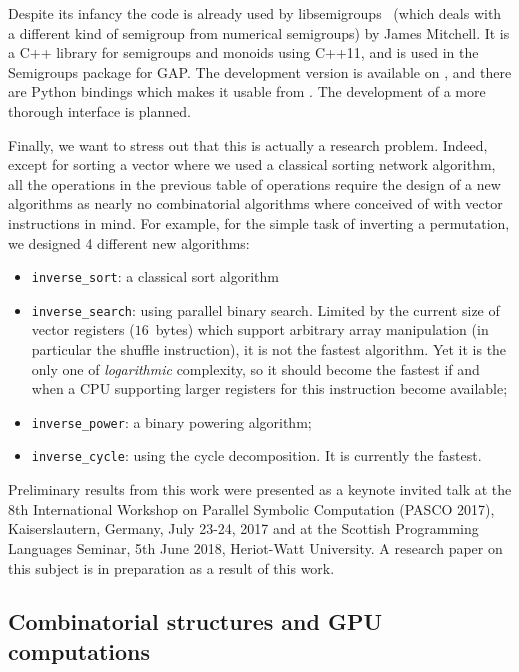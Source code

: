 \documentclass{deliverablereport}
\begin{document}
Despite its infancy the code is already used by
libsemigroups~\cite{libsemigroups} (which deals with a different kind of
semigroup from numerical semigroups) by James Mitchell. It is a C++ library
for semigroups and monoids using C++11, and is used in the Semigroups package
for GAP. The development version is available on \GitHub, and there are Python
bindings which makes it usable from \Sage. The development of a more thorough
\Sage interface is planned.  \bigskip

Finally, we want to stress out that this is actually a research
problem. Indeed, except for sorting a vector where we used a classical sorting
network algorithm, all the operations in the previous table of operations
require the design of a new algorithms as nearly no combinatorial algorithms
where conceived of with vector instructions in mind. For example, for the
simple task of inverting a permutation, we designed 4 different new
algorithms:
\begin{itemize}
\item \verb|inverse_sort|:  a classical sort algorithm
\item \verb|inverse_search|:  using parallel binary
  search. Limited by the current size of vector registers ($16$~bytes) which support
  arbitrary array manipulation (in particular the shuffle instruction), it is
  not the fastest algorithm. Yet it is the only one of {\em logarithmic} complexity,
  so it should become the fastest if and when a CPU supporting larger registers
  for this instruction become available;
\item \verb|inverse_power|: a binary powering algorithm;
\item \verb|inverse_cycle|: using the cycle decomposition. It is currently the fastest.
\end{itemize}
Preliminary results from this work were presented as a keynote invited talk at
the 8th International Workshop on Parallel Symbolic Computation (PASCO 2017),
Kaiserslautern, Germany, July 23-24, 2017 and at the Scottish Programming
Languages Seminar, 5th June 2018, Heriot-Watt University. A research paper on
this subject is in preparation as a result of this work.

\subsection{Combinatorial structures and GPU computations}
\end{document}
